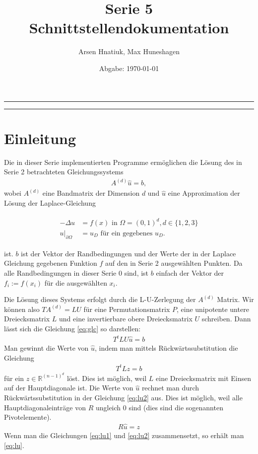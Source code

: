 \documentclass[letterpaper,10pt,ngerman, oneside, openright]{sphinxmanual}
\title{Serie 5 Schnittstellendokumentation}
\date{Abgabe: \today}
\author{Arsen Hnatiuk, Max Huneshagen}
\begin{document}
\maketitle
\tableofcontents
\bigskip

\hrule
\hrule


\chapter{Einleitung}

Die in dieser Serie implementierten Programme ermöglichen die Lösung des in Serie 2 betrachteten Gleichungssystems
\begin{align}
A^{(d)}\hat{u} = b,
\label{eq:glc}
\end{align}
wobei $A^{(d)}$ eine Bandmatrix der Dimension $d$ und $\hat{u}$ eine Approximation der Lösung der Laplace-Gleichung

\begin{align}
\begin{split}
-\Delta u&=f(x)\text{ in }\Omega=(0, 1)^d, d\in\{1,2,3\}\\
u \vert _{\partial\Omega}&=u_D\text{ für ein gegebenes }u_D.
\end{split}
\label{eq:rwp}
\end{align}


ist. $b$ ist der Vektor der Randbedingungen und der Werte der in der Laplace Gleichung gegebenen Funktion $f$ auf den in Serie 2 ausgewählten Punkten. Da alle Randbedingungen in dieser Serie $0$ sind, ist $b$ einfach der Vektor der $f_i := f(x_i)$ für die ausgewählten $x_i$. 

Die Lösung dieses Systems erfolgt durch die L-U-Zerlegung der $A^{(d)}$ Matrix. Wir können also $TA^{(d)}=LU$ für eine Permutationsmatrix $P$, eine unipotente untere Dreiecksmatrix $L$ und eine invertierbare obere Dreiecksmatrix $U$ schreiben. Dann lässt sich die Gleichung \ref{eq:glc} so darstellen:
\begin{align}
T^tLU\hat{u}=b
\label{eq:lu}
\end{align}
Man gewinnt die Werte von $\hat{u}$, indem man mittels Rückwärtssubstitution die Gleichung 
\begin{align}
T^tLz=b
\label{eq:lu1}
\end{align}
für ein $z\in \mathbb{R}^{(n-1)^d}$ löst. Dies ist möglich, weil $L$ eine Dreiecksmatrix mit Einsen auf der Hauptdiagonale ist. Die Werte von $\hat{u}$ rechnet man durch Rückwärtssubstitution in der Gleichung \eqref{eq:lu2} aus. Dies ist möglich, weil alle Hauptdiagonaleinträge von $R$ ungleich $0$ sind (dies sind die sogenannten Pivotelemente).
\begin{align}
R\hat{u}=z
\label{eq:lu2}
\end{align}
Wenn man die Gleichungen \eqref{eq:lu1} und \eqref{eq:lu2} zusammensetzt, so erhält man \eqref{eq:lu}.
\end{document}
